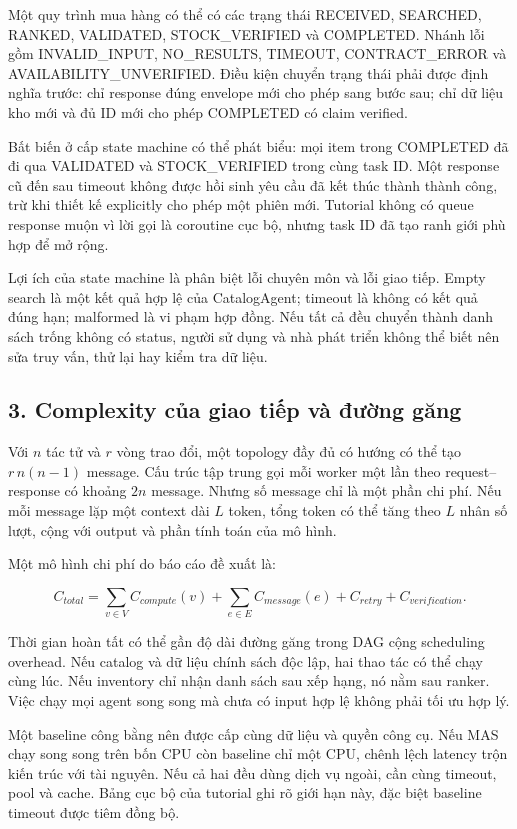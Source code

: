 Một quy trình mua hàng có thể có các trạng thái RECEIVED, SEARCHED,
RANKED, VALIDATED, STOCK\_VERIFIED và COMPLETED. Nhánh lỗi gồm
INVALID\_INPUT, NO\_RESULTS, TIMEOUT, CONTRACT\_ERROR và
AVAILABILITY\_UNVERIFIED. Điều kiện chuyển trạng thái phải được định
nghĩa trước: chỉ response đúng envelope mới cho phép sang bước sau; chỉ
dữ liệu kho mới và đủ ID mới cho phép COMPLETED có claim verified.

Bất biến ở cấp state machine có thể phát biểu: mọi item trong COMPLETED
đã đi qua VALIDATED và STOCK\_VERIFIED trong cùng task ID. Một response
cũ đến sau timeout không được hồi sinh yêu cầu đã kết thúc thành thành
công, trừ khi thiết kế explicitly cho phép một phiên mới. Tutorial không
có queue response muộn vì lời gọi là coroutine cục bộ, nhưng task ID đã
tạo ranh giới phù hợp để mở rộng.

Lợi ích của state machine là phân biệt lỗi chuyên môn và lỗi giao tiếp.
Empty search là một kết quả hợp lệ của CatalogAgent; timeout là không có
kết quả đúng hạn; malformed là vi phạm hợp đồng. Nếu tất cả đều chuyển
thành danh sách trống không có status, người sử dụng và nhà phát triển
không thể biết nên sửa truy vấn, thử lại hay kiểm tra dữ liệu.

\subsection{3. Complexity của giao tiếp và đường
găng}\label{complexity-cux1ee7a-giao-tiux1ebfp-vuxe0-ux111ux1b0ux1eddng-gux103ng}

Với \(n\) tác tử và \(r\) vòng trao đổi, một topology đầy đủ có hướng có
thể tạo \(r\,n(n-1)\) message. Cấu trúc tập trung gọi mỗi worker một lần
theo request--response có khoảng \(2n\) message. Nhưng số message chỉ là
một phần chi phí. Nếu mỗi message lặp một context dài \(L\) token, tổng
token có thể tăng theo \(L\) nhân số lượt, cộng với output và phần tính
toán của mô hình.

Một mô hình chi phí do báo cáo đề xuất là:

\[C_{total}=\sum_{v\in V}C_{compute}(v)+\sum_{e\in E}C_{message}(e)+C_{retry}+C_{verification}.\]

Thời gian hoàn tất có thể gần độ dài đường găng trong DAG cộng
scheduling overhead. Nếu catalog và dữ liệu chính sách độc lập, hai thao
tác có thể chạy cùng lúc. Nếu inventory chỉ nhận danh sách sau xếp hạng,
nó nằm sau ranker. Việc chạy mọi agent song song mà chưa có input hợp lệ
không phải tối ưu hợp lý.

Một baseline công bằng nên được cấp cùng dữ liệu và quyền công cụ. Nếu
MAS chạy song song trên bốn CPU còn baseline chỉ một CPU, chênh lệch
latency trộn kiến trúc với tài nguyên. Nếu cả hai đều dùng dịch vụ
ngoài, cần cùng timeout, pool và cache. Bảng cục bộ của tutorial ghi rõ
giới hạn này, đặc biệt baseline timeout được tiêm đồng bộ.

